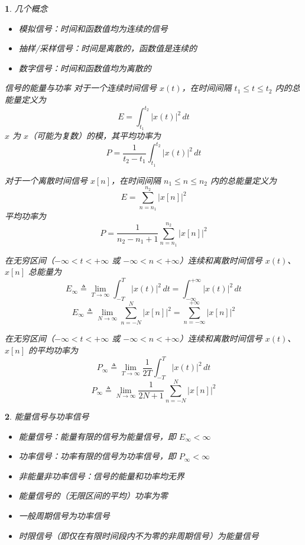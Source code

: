 \documentclass[UTF8]{report}
\theoremstyle{MyLineTheoremStyle} %
\theoremstyle{MyBlockTheoremStyle} %
\theoremstyle{MySubsubsectionStyle} %
\newtheorem{definition}{}
\begin{document}
\begin{definition}
    几个概念
    \begin{itemize}
        \item 模拟信号：时间和函数值均为连续的信号
        \item 抽样/采样信号：时间是离散的，函数值是连续的
        \item 数字信号：时间和函数值均为离散的
    \end{itemize}

    信号的能量与功率
    对于一个连续时间信号 $x(t)$，在时间间隔 $t_1 \leq t \leq t_2$ 内的总能量定义为
    \[
    E = \int_{t_1}^{t_2} |x(t)|^2 \, dt
    \]
    $x$ 为 $x$（可能为复数）的模，其平均功率为
    \[
    P = \frac{1}{t_2 - t_1} \int_{t_1}^{t_2} |x(t)|^2 \, dt
    \]

    对于一个离散时间信号 $x[n]$，在时间间隔 $n_1 \leq n \leq n_2$ 内的总能量定义为
    \[
    E = \sum_{n=n_1}^{n_2} |x[n]|^2
    \]
    平均功率为
    \[
    P = \frac{1}{n_2 - n_1 + 1} \sum_{n=n_1}^{n_2} |x[n]|^2
    \]

    在无穷区间（$-\infty < t < +\infty$ 或 $-\infty < n < +\infty$）连续和离散时间信号 $x(t)$、$x[n]$ 总能量为
    \[
    E_\infty \triangleq \lim_{T \to \infty} \int_{-T}^{T} |x(t)|^2 \, dt = \int_{-\infty}^{+\infty} |x(t)|^2 \, dt
    \]
    \[
    E_\infty \triangleq \lim_{N \to \infty} \sum_{n=-N}^{N} |x[n]|^2 = \sum_{n=-\infty}^{+\infty} |x[n]|^2
    \]

    在无穷区间（$-\infty < t < +\infty$ 或 $-\infty < n < +\infty$）连续和离散时间信号 $x(t)$、$x[n]$ 的平均功率为
    \[
    P_\infty \triangleq \lim_{T \to \infty} \frac{1}{2T} \int_{-T}^{T} |x(t)|^2 \, dt
    \]
    \[
    P_\infty \triangleq \lim_{N \to \infty} \frac{1}{2N + 1} \sum_{n=-N}^{N} |x[n]|^2
    \]
\end{definition}

\begin{definition}
    能量信号与功率信号
    \begin{itemize}
        \item 能量信号：能量有限的信号为能量信号，即 $E_\infty < \infty$
        \item 功率信号：功率有限的信号为功率信号，即 $P_\infty < \infty$
        \item 非能量非功率信号：信号的能量和功率均无界
    \end{itemize}
    \begin{itemize}
        \item 能量信号的（无限区间的平均）功率为零
        \item 一般周期信号为功率信号
        \item 时限信号（即仅在有限时间段内不为零的非周期信号）为能量信号
    \end{itemize}
\end{definition}
\end{document}
